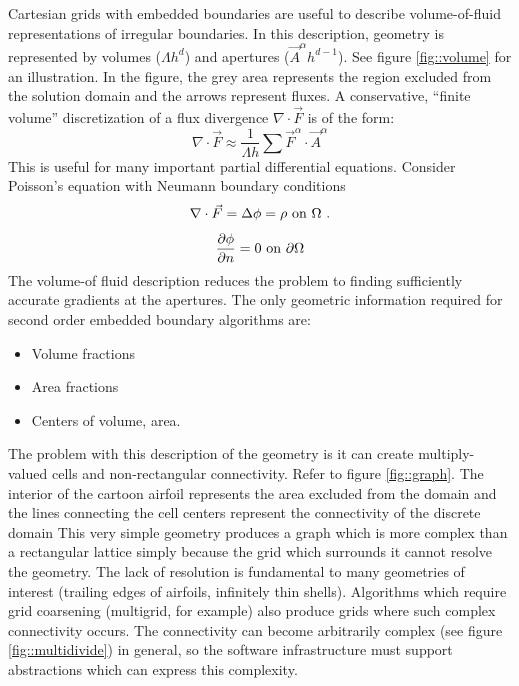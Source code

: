 Cartesian grids with embedded boundaries are 
useful to describe
volume-of-fluid representations of irregular boundaries.
In this description,
geometry is represented by volumes ($\Lambda h^d$) and apertures 
($\vec{A}^\alpha h^{d-1}$).   See figure \ref{fig::volume}
for an illustration.  In the figure, the grey area represents 
the region excluded from the solution domain and the arrows represent
fluxes.  A conservative, ``finite volume'' discretization
of a flux divergence $\nabla \cdot \vec{F}$ is of the form:
\begin{equation}
\nabla \cdot \vec{F} \approx \frac{1}{\Lambda h} \sum \vec{F}^\alpha \cdot
\vec{A}^\alpha
\end{equation}
This is useful for many important partial differential equations.
Consider  Poisson's equation with Neumann boundary conditions
\begin{equation}
\nabla \cdot \vec{F} = \Delta \phi = \rho \hbox{ on $\Omega$ }.
\end{equation}
\begin{equation}
\frac{\partial \phi}{\partial n} = 0 \hbox{ on $\partial \Omega$}
\end{equation}
The volume-of fluid description reduces the problem to finding
sufficiently accurate gradients at the apertures.   
The only geometric information required for second order embedded
boundary algorithms are:
\begin{itemize}
\item
Volume fractions
\item
Area fractions
\item 
Centers of volume, area.
\end{itemize}
The problem with this description of the geometry 
is it can create  multiply-valued cells and
non-rectangular connectivity.
Refer to figure \ref{fig::graph}.  
The interior of the cartoon airfoil represents the area
excluded from the domain and the lines connecting the cell centers
represent the connectivity of the discrete domain
This very simple geometry produces a graph
which is more complex than a rectangular lattice simply because
the grid which surrounds it cannot resolve the geometry.
The lack of resolution is fundamental to many geometries 
of interest (trailing edges of airfoils, infinitely thin shells).
Algorithms which require grid coarsening (multigrid, for example)
also produce grids where such complex connectivity occurs.
The connectivity can become arbitrarily complex (see figure 
\ref{fig::multidivide}) in general, so the software infrastructure
must support abstractions which can express this complexity.

